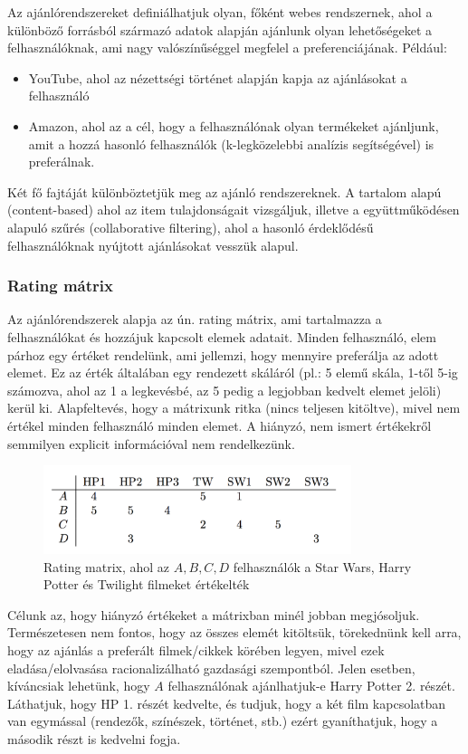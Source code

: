\documentclass[a4paper,12pt]{article}
\begin{document}
Az ajánlórendszereket definiálhatjuk olyan, főként webes rendszernek, ahol a különböző forrásból származó adatok alapján ajánlunk olyan lehetőségeket a felhasználóknak, ami nagy valószínűséggel megfelel a preferenciájának. Például:
\begin{itemize}
\item YouTube, ahol az nézettségi történet alapján kapja az ajánlásokat a felhasználó
\item Amazon, ahol az a cél, hogy a felhasználónak olyan termékeket ajánljunk, amit a hozzá hasonló felhasználók (k-legközelebbi analízis segítségével) is preferálnak. \cite{knearest}
\end{itemize}
Két fő fajtáját különböztetjük meg az ajánló rendszereknek. A tartalom alapú (content-based) ahol az item tulajdonságait vizsgáljuk, illetve a együttműködésen alapuló szűrés (collaborative filtering), ahol a hasonló érdeklődésű felhasználóknak nyújtott ajánlásokat vesszük alapul. \newline


\subsubsection{Rating mátrix}

Az ajánlórendszerek alapja az ún. rating mátrix, ami tartalmazza a felhasználókat és hozzájuk kapcsolt elemek adatait. Minden felhasználó, elem párhoz egy értéket rendelünk, ami jellemzi, hogy mennyire preferálja az adott elemet. Ez az érték általában egy rendezett skáláról (pl.: 5 elemű skála, 1-től 5-ig számozva, ahol az 1 a legkevésbé, az 5 pedig a legjobban kedvelt elemet jelöli) kerül ki. Alapfeltevés, hogy a mátrixunk ritka (nincs teljesen kitöltve), mivel nem értékel minden felhasználó minden elemet. A hiányzó, nem ismert értékekről semmilyen explicit információval nem rendelkezünk.

\begin{figure}[ht!]
\centering
\includegraphics[width=90mm]{img/um.png}
\caption{Rating matrix, ahol az $A,B, C, D$ felhasználók a Star Wars, Harry Potter és Twilight filmeket értékelték~\cite[322 o.]{overfit} \label{um}}
\end{figure}

Célunk az, hogy hiányzó értékeket a mátrixban minél jobban megjósoljuk. Természetesen nem fontos, hogy az összes elemét kitöltsük, törekednünk kell arra, hogy az ajánlás a preferált filmek/cikkek körében legyen, mivel ezek eladása/elolvasása racionalizálható gazdasági szempontból. Jelen esetben, kíváncsiak lehetünk, hogy $A$ felhasználónak ajánlhatjuk-e Harry Potter 2. részét. Láthatjuk, hogy HP 1. részét kedvelte, és tudjuk, hogy a két film kapcsolatban van egymással (rendezők, színészek, történet, stb.) ezért gyaníthatjuk, hogy a második részt is kedvelni fogja.
\end{document}
